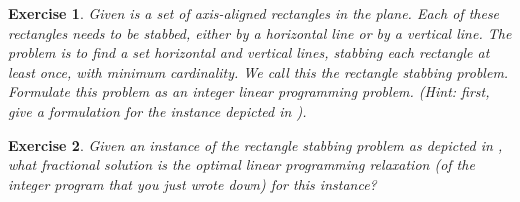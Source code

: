 \documentclass[titlepage]{book}
\newtheorem{exercise}{Exercise}
\begin{document}
\begin{exercise}
Given is a set of axis-aligned rectangles in the plane. Each of these rectangles needs to be stabbed, either by a horizontal line or by a vertical line. The problem is to find a set horizontal and vertical lines, stabbing each rectangle at least once, with minimum cardinality. We call this the rectangle stabbing problem. Formulate this problem as an integer linear programming problem. (Hint: first, give a formulation for the instance depicted in ).
\end{exercise}
\begin{exercise}
Given an instance of the rectangle stabbing problem as depicted in , what fractional solution is the optimal linear programming relaxation (of the integer program that you just wrote down) for this instance?
\end{exercise}




\end{document}
